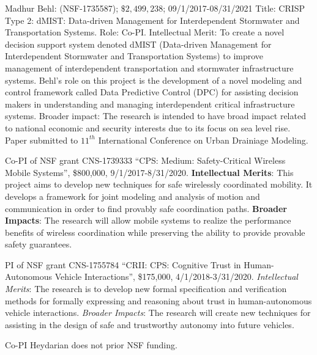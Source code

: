 Madhur Behl: (NSF-1735587); $\$2,499,238$; 09/1/2017-08/31/2021 Title: CRISP Type 2: dMIST: Data-driven Management for Interdependent Stormwater and Transportation Systems. Role: Co-PI. Intellectual Merit: To create a novel decision support system denoted dMIST (Data-driven Management for Interdependent Stormwater and Transportation Systems) to improve management of interdependent transportation and stormwater infrastructure systems. Behl's role on this project is the development of a novel modeling and control framework called Data Predictive Control (DPC) for assisting decision makers in understanding and managing interdependent critical infrastructure systems. Broader impact: The research is intended to have broad impact related to national economic and security interests due to its focus on sea level rise. Paper submitted to $11^{th}$ International Conference on Urban Drainiage Modeling. 



\vspace{4pt}%
{}

\vspace{4pt}%
{}
Co-PI of NSF grant CNS-1739333 ``CPS: Medium: Safety-Critical Wireless Mobile Systems'', \$800,000, 9/1/2017-8/31/2020. \textbf{Intellectual Merits}: This project aims to develop new techniques for safe wirelessly coordinated mobility.
It develops a framework for joint modeling and analysis of motion and communication in order to find provably safe coordination paths. 
\textbf{Broader Impacts}: The research will allow mobile systems to realize the performance benefits of wireless coordination while preserving the ability to provide provable safety guarantees. 

PI of NSF grant CNS-1755784 ``CRII: CPS: Cognitive Trust in Human-Autonomous Vehicle Interactions'', \$175,000, 4/1/2018-3/31/2020.
\emph{Intellectual Merits}: The research is to develop new formal specification and verification methods for formally expressing and reasoning about trust in human-autonomous vehicle interactions.
\emph{Broader Impacts}: The research will create new techniques for assisting in the design of safe and trustworthy autonomy into future vehicles.


Co-PI Heydarian does not prior NSF funding. 
